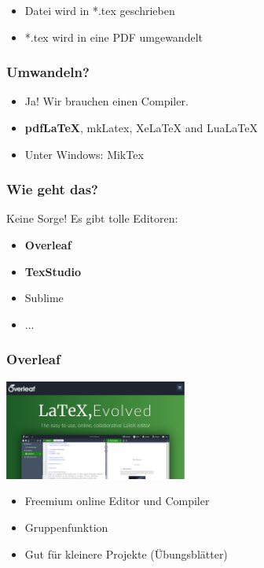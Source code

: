 \documentclass{beamer}
\begin{document}
\begin{frame}
\begin{columns}[c]
     \end{columns}
\begin{itemize}[<+->]
     \item Datei wird in *.tex geschrieben
     \item *.tex wird in eine PDF umgewandelt
\end{itemize}
\end{frame}

\begin{frame}
     \frametitle{Umwandeln?}
     \begin{itemize}[<+->]
          \item Ja! Wir brauchen einen Compiler.
               \item \textbf{pdfLaTeX}, mkLatex, XeLaTeX and LuaLaTeX
               \item Unter Windows: MikTex
     \end{itemize}
\end{frame}




\begin{frame}
     \frametitle{Wie geht das?}
     Keine Sorge! Es gibt tolle Editoren:
     \begin{itemize}[<+->]
          \item \textbf{Overleaf}
          \item \textbf{TexStudio}
          \item Sublime 
          \item ...
     \end{itemize}
\end{frame}

\begin{frame}
	\frametitle{Overleaf}
	\includegraphics[width=6cm]{pictures/overleaf.png}
	\begin{itemize}[<+->]
		\item Freemium online Editor und Compiler
		\item Gruppenfunktion
		\item Gut für kleinere Projekte (Übungsblätter)
	\end{itemize}
\end{frame}
\end{document}
